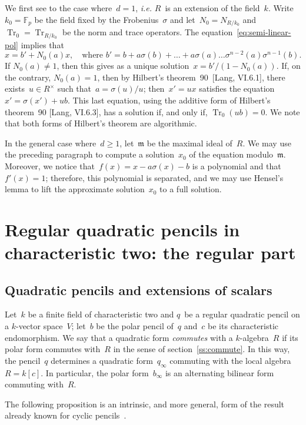 \documentclass{lms}
\let\fr\mathfrak
\DeclareMathOperator\Tr{Tr}
\def\F{\mathbb{F}}
\begin{document}
We first see to the case where~$d = 1$, \emph{i.e.} $R$~is an extension
of the field~$k$. Write~$k_0 = \F_p$ be the field fixed by the
Frobenius~$σ$ and let~$N_0 = N_{R/k_0}$ and~$\Tr_0 = \Tr_{R/k_0}$ be the
norm and trace operators. The equation~\eqref{eq:semi-linear-pol} implies
that
\begin{equation}
x = b' + N_0(a) x, \quad\text{where $b' = b + a σ(b) + … + a σ(a) …
σ^{n-2}(a) σ^{n-1}(b)$.}
\end{equation}
If $N_0(a) ≠ 1$, then this gives as a unique solution~$x =
b'/(1-N_0(a))$. If, on the contrary, $N_0(a) = 1$, then by
Hilbert's theorem~90~[Lang, VI.6.1], there exists~$u ∈ R^{×}$ such
that~$a = σ(u)/u$; then~$x' = ux$ satisfies the equation~$x' = σ(x') +
ub$. This last equation, using the additive form of Hilbert's theorem~90
[Lang, VI.6.3], has a solution if, and only if, $\Tr_0 (ub) = 0$. We
note that both forms of Hilbert's theorem are algorithmic.

In the general case where~$d ≥ 1$, let~$\fr m$ be the maximal ideal
of~$R$. We may use the preceding paragraph to compute a solution~$x_0$ of
the equation modulo~$\fr m$. Moreover, we notice that~$f(x) = x -  a σ(x)
- b$ is a polynomial and that~$f'(x) = 1$; therefore, this polynomial is
separated, and we may use Hensel's lemma to lift the approximate
solution~$x_0$ to a full solution.

\section{Regular quadratic pencils in characteristic two: the regular part}
\label{S:quad-reg}
\subsection{Quadratic pencils and extensions of scalars}
Let~$k$ be a finite field of characteristic two and $q$~be a regular
quadratic pencil on a $k$-vector space~$V$;
let~$b$ be the polar pencil of~$q$ and~$c$ be its characteristic endomorphism.
We say that a quadratic form \emph{commutes} with a $k$-algebra~$R$ if
its polar form commutes with~$R$ in the sense of
section~\ref{ss:commute}.
In this way, the pencil~$q$ determines a quadratic form~$q_{∞}$
commuting with the local algebra~$R = k[c]$.
In particular, the polar form~$b_{∞}$ is an alternating bilinear form
commuting with~$R$.

The following proposition is an intrinsic, and more general, form
of the result already known for cyclic pencils~\cite[Prop.~5]{MPG2013}.
\end{document}
